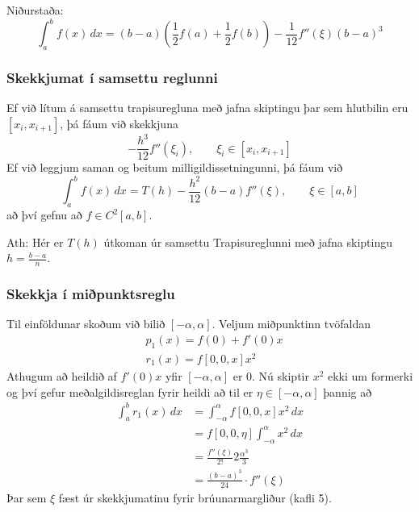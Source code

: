 \documentclass[icelandic,a4paper,12pt]{article}
\begin{document}
\pause
\smallskip
Niðurstaða:
\begin{equation*}
  \int_a^b f(x)\,dx = (b-a)
  \left( \frac{1}{2} f(a) + \frac{1}{2}f(b) \right) 
  - \frac{1}{12} f''(\xi)(b-a)^3
\end{equation*}



\subsubsection{Skekkjumat í samsettu reglunni} 
Ef við lítum á samsettu trapisuregluna með jafna skiptingu þar sem 
hlutbilin eru $[x_i,
x_{i+1}]$, þá fáum við skekkjuna 
\begin{equation*}
  - \frac{h^3}{12}f''(\xi_i), \qquad \xi_i \in [x_i, x_{i+1}]
\end{equation*}
\pause
Ef við leggjum saman og beitum milligildissetningunni, þá fáum við
\begin{equation*}
  \int_a^b f(x)\,dx = T(h) - \frac{h^2}{12}(b-a)f''(\xi), \qquad 
  \xi \in [a,b]
\end{equation*}
að því gefnu að $f\in C^2 [a,b]$.

\smallskip
Ath: Hér er $T(h)$ útkoman úr samsettu Trapisureglunni með 
jafna skiptingu $h = \frac{b-a}n$.



\subsubsection{Skekkja í miðpunktsreglu} 
Til einföldunar skoðum við bilið $[-\alpha,\alpha]$.
Veljum miðpunktinn tvöfaldan
\begin{align*}
  &p_1(x) = f(0) + f'(0)x\\
  &r_1(x) = f[0,0,x]x^2
\end{align*}
Athugum að heildið af $f'(0)x$ yfir $[-\alpha,\alpha]$ er 0. \pause
Nú skiptir $x^2$ ekki um formerki og því gefur meðalgildisreglan 
fyrir heildi að til er $\eta \in [-\alpha,\alpha]$ þannig að
\begin{align*}
  \int_a^b r_1(x)\,dx 
  &= \int_{-\alpha}^{\alpha} f[0,0,x]x^2 \,dx\\
  &= f[0,0,\eta]\int_{-\alpha}^\alpha x^2\,dx\\
  &= \frac{f''(\xi)}{2!}2\frac{\alpha^3}{3}\\
  &= \frac{(b-a)^3}{24}\cdot f''(\xi)
\end{align*}
Þar sem $\xi$ fæst úr skekkjumatinu fyrir brúunarmargliður (kafli 5).
\end{document}
